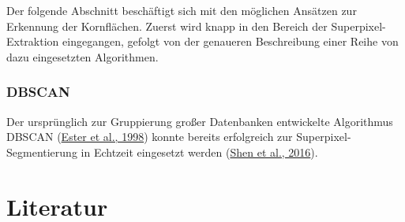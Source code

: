 \documentclass[
  12pt,
]{book}
\begin{document}
Der folgende Abschnitt beschäftigt sich mit den möglichen Ansätzen zur Erkennung der Kornflächen. Zuerst wird knapp in den Bereich der Superpixel-Extraktion eingegangen, gefolgt von der genaueren Beschreibung einer Reihe von dazu eingesetzten Algorithmen.

\hypertarget{section}{%
\subsection{}\label{section}}

\hypertarget{dbscan}{%
\subsection{DBSCAN}\label{dbscan}}

Der ursprünglich zur Gruppierung großer Datenbanken entwickelte Algorithmus DBSCAN (\protect\hyperlink{ref-esterIncrementalClusteringMining1998}{Ester et al., 1998}) konnte bereits erfolgreich zur Superpixel-Segmentierung in Echtzeit eingesetzt werden (\protect\hyperlink{ref-shenRealTimeSuperpixelSegmentation2016}{Shen et al., 2016}).

\hypertarget{literatur}{%
\chapter{Literatur}\label{literatur}}
\end{document}
